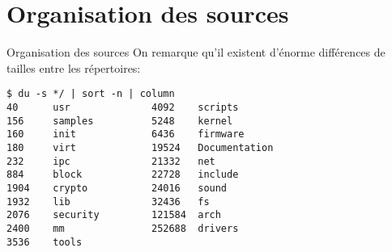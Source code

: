 \section{Organisation des sources}

\begin{frame}[fragile=singleslide]{Organisation des sources}
  On remarque qu'il existent d'énorme différences de tailles entre les
  répertoires:
  \begin{lstlisting}
$ du -s */ | sort -n | column
40      usr              4092    scripts
156     samples          5248    kernel
160     init             6436    firmware
180     virt             19524   Documentation
232     ipc              21332   net
884     block            22728   include
1904    crypto           24016   sound
1932    lib              32436   fs
2076    security         121584  arch
2400    mm               252688  drivers
3536    tools
  \end{lstlisting} 
\end{frame}

